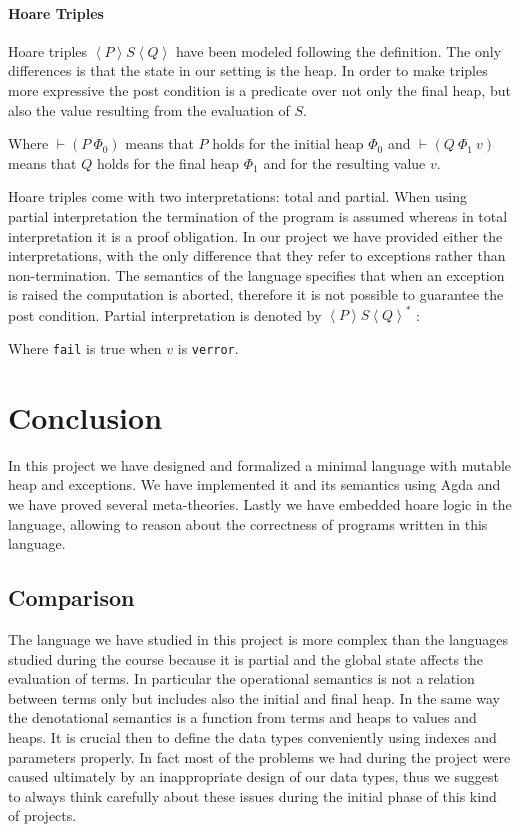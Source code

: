 \documentclass[12pt, a4paper, oneside]{article}
\newcommand{\sproof}{
  \scriptsize
  \begin{center}
  \begin{prooftree}
  \def\defaultHypSeparation{\hskip .1in}
}
\newcommand{\eproof}{
  \end{prooftree}
  \end{center}
  \normalsize
}
\begin{document}
\paragraph{Hoare Triples}
Hoare triples $ \left\langle P \right\rangle   S \left\langle Q \right\rangle$ have been modeled following the definition. The only differences is that the state in our  setting is the heap. In order to make triples more expressive the post condition is a predicate over not only the final heap, but also the value resulting from the evaluation of $S$.

\sproof
{}
\eproof
Where $\vdash (P\  \Phi_0)$ means that $P$ holds for the initial heap $\Phi_0$ and $\vdash (Q\ \Phi_1\ v)$ means that $Q$ holds for the final heap $\Phi_1$ and for the resulting value $v$.

Hoare triples come with two interpretations: total and partial.
When using partial interpretation the termination of the program is assumed whereas in total interpretation it is a proof obligation.
In our project we have provided either the interpretations, with the only difference that they refer to exceptions rather than non-termination.
The semantics of the language specifies that when an exception is raised the computation is aborted, therefore it is not possible to guarantee the post condition.
Partial interpretation is denoted by $ \left\langle P \right\rangle  S \left\langle Q \right\rangle^*$ :
\sproof
{}
\eproof
Where \texttt{fail} is true when $v$ is \texttt{verror}.

\section{Conclusion}
\label{sec:conclusion}
In this project we have designed and formalized a minimal language with mutable heap and exceptions. We have implemented it and its semantics using Agda and we have proved several meta-theories. 
Lastly we have embedded hoare logic  in the language, allowing to reason about the correctness of programs written in this language.

\subsection{Comparison}
The language we have studied in this project is more complex than the languages studied during the course because it is partial and the global state affects the evaluation of terms. In particular the operational semantics is not a relation between terms only but includes also the initial and final heap. In the same way the denotational semantics is a function from terms and heaps to values and heaps. It is crucial then to define the data types conveniently using indexes and parameters properly. In fact most of the problems we had during the project were caused ultimately by an inappropriate design of our data types, thus we suggest to always think carefully about these issues during the initial phase of this kind of projects.
\end{document}
